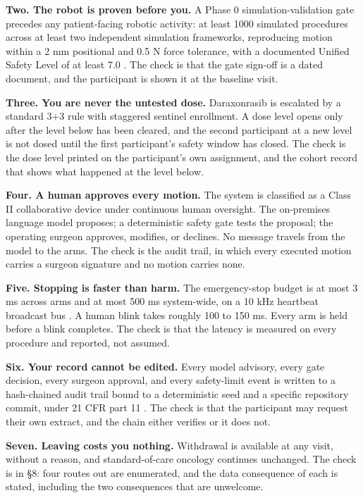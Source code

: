 \textbf{Two. The robot is proven before you.} A Phase 0 simulation-validation
gate precedes any patient-facing robotic activity: at least 1000 simulated
procedures across at least two independent simulation frameworks, reproducing
motion within a 2 mm positional and 0.5 N force tolerance, with a documented
Unified Safety Level of at least 7.0 \cite{cfr312paiuni, pdac060s2030}. The
check is that the gate sign-off is a dated document, and the participant is
shown it at the baseline visit.

\textbf{Three. You are never the untested dose.} Daraxonrasib is escalated by a
standard 3+3 rule with staggered sentinel enrollment. A dose level opens only
after the level below has been cleared, and the second participant at a new
level is not dosed until the first participant's safety window has closed. The
check is the dose level printed on the participant's own assignment, and the
cohort record that shows what happened at the level below.

\textbf{Four. A human approves every motion.} The system is classified as a
Class II collaborative device under continuous human oversight. The on-premises
language model proposes; a deterministic safety gate tests the proposal; the
operating surgeon approves, modifies, or declines. No message travels from the
model to the arms. The check is the audit trail, in which every executed motion
carries a surgeon signature and no motion carries none.

\textbf{Five. Stopping is faster than harm.} The emergency-stop budget is at
most 3 ms across arms and at most 500 ms system-wide, on a 10 kHz heartbeat
broadcast bus \cite{ieee7009, iec8060127}. A human blink takes roughly 100 to
150 ms. Every arm is held before a blink completes. The check is that the
latency is measured on every procedure and reported, not assumed.

\textbf{Six. Your record cannot be edited.} Every model advisory, every gate
decision, every surgeon approval, and every safety-limit event is written to a
hash-chained audit trail bound to a deterministic seed and a specific repository
commit, under 21 CFR part 11 \cite{ecfr2026part11}. The check is that the
participant may request their own extract, and the chain either verifies or it
does not.

\textbf{Seven. Leaving costs you nothing.} Withdrawal is available at any visit,
without a reason, and standard-of-care oncology continues unchanged. The check
is in \S 8: four routes out are enumerated, and the data consequence of each is
stated, including the two consequences that are unwelcome.

